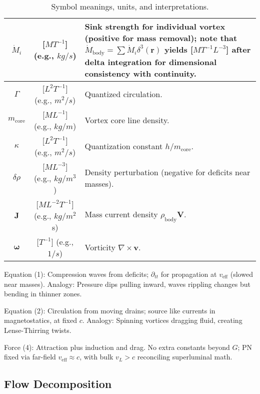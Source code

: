 \documentclass{article}
\begin{document}
\begin{table}[h!]
\begin{tabularx}{\textwidth}{|c|c|Y|}
$\dot{M}_i$ & [$M T^{-1}$] (e.g., $kg/s$) & Sink strength for individual vortex (positive for mass removal); note that $\dot{M}_{\text{body}} = \sum \dot{M}_i \delta^3(\mathbf{r})$ yields [$M T^{-1} L^{-3}$] after delta integration for dimensional consistency with continuity. \\
\hline
$\Gamma$ & [$L^2 T^{-1}$] (e.g., $m^2/s$) & Quantized circulation. \\
\hline
$m_{\text{core}}$ & [$M L^{-1}$] (e.g., $kg/m$) & Vortex core line density. \\
\hline
$\kappa$ & [$L^2 T^{-1}$] (e.g., $m^2/s$) & Quantization constant $h / m_{\text{core}}$. \\
\hline
$\delta \rho$ & [$M L^{-3}$] (e.g., $kg/m^3$) & Density perturbation (negative for deficits near masses). \\
\hline
$\mathbf{J}$ & [$M L^{-2} T^{-1}$] (e.g., $kg/m^2$ s) & Mass current density $\rho_{\text{body}} \mathbf{V}$.\protect\footnotemark \\
\hline
$\boldsymbol{\omega}$ & [$T^{-1}$] (e.g., $1/s$) & Vorticity $\nabla \times \mathbf{v}$. \\
\hline
\end{tabularx}
\caption{Symbol meanings, units, and interpretations.\protect\footnotemark}
\end{table}



Equation (1): Compression waves from deficits; $\partial_{tt}$ for propagation at $v_{\text{eff}}$ (slowed near masses). Analogy: Pressure dips pulling inward, waves rippling changes but bending in thinner zones.

Equation (2): Circulation from moving drains; source like currents in magnetostatics, at fixed $c$. Analogy: Spinning vortices dragging fluid, creating Lense-Thirring twists.

Force (4): Attraction plus induction and drag. No extra constants beyond $G$; PN fixed via far-field $v_{\text{eff}} \approx c$, with bulk $v_L > c$ reconciling superluminal math.

\subsection{Flow Decomposition}
\end{document}
